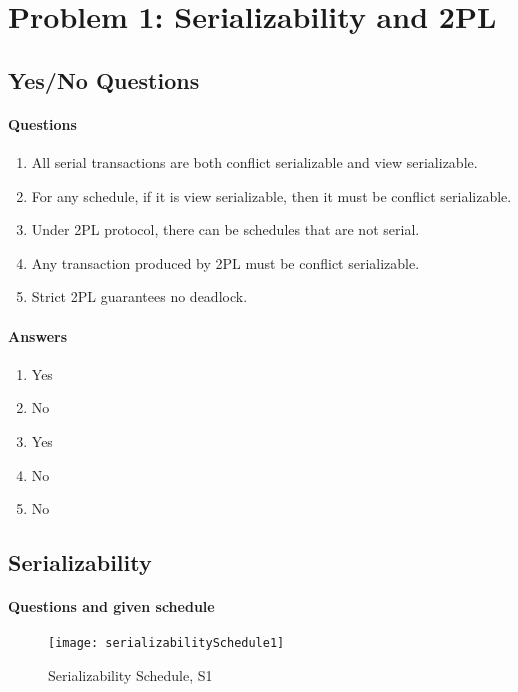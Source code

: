 \section{Problem 1: Serializability and 2PL}
\subsection{Yes/No Questions}
\paragraph{Questions}
\begin{enumerate}
	\item  All serial transactions are both conﬂict serializable and view serializable.
	\item For any schedule, if it is view serializable, then it must be conﬂict serializable.
	\item  Under 2PL protocol, there can be schedules that are not serial.
	\item  Any transaction produced by 2PL must be conﬂict serializable.
	\item  Strict 2PL guarantees no deadlock.
\end{enumerate}

\paragraph{Answers}
\begin{enumerate}
	\item Yes
	\item No
	\item Yes
	\item No
	\item No
\end{enumerate}

\subsection{Serializability}
\paragraph{Questions and given schedule}


\begin{figure}[H]
	\texttt{[image: serializabilitySchedule1]}
	\caption{Serializability Schedule, S1}
	\label{Serializability Schedule}
\end{figure}

